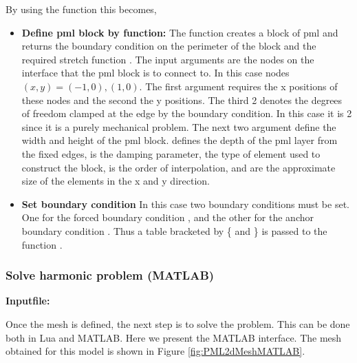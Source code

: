 \clearpage
By using the function  this becomes,
\begin{itemize}

  \item{\textbf{Define pml block by function:}}
  The function creates a block of pml and returns the boundary 
  condition on the perimeter of the block  and 
  the required stretch function . The input
  arguments are the nodes on the interface that the pml block is 
  to connect to. In this case nodes $(x,y) = (-1,0),(1,0)$. The
  first argument requires the x positions of these nodes and the 
  second the y positions. The third 2 denotes the degrees of freedom
  clamped at the edge by the boundary condition. In this case it is
  2 since it is a purely mechanical problem. The next two argument
  define the width and height of the pml block.  defines
  the depth of the pml layer from the fixed edges,  is the
  damping parameter,  the type of element used to construct
  the block,  is the order of interpolation, and 
   are the approximate size of the elements in the 
  x and y direction.

  \item{\textbf{Set boundary condition}}
  In this case two boundary conditions must be set. One for the 
  forced boundary condition , and the other for
  the anchor boundary condition . Thus a table
  bracketed by \{ and \} is passed to the function .

\end{itemize}

\clearpage
\subsubsection*{Solve harmonic problem (MATLAB)}
\begin{flushleft}
  \textbf{Inputfile:}
  \\
\end{flushleft}
\hspace{1in}
{\footnotesize
{}
}

\clearpage
Once the mesh is defined, the next step is to solve the problem.
This can be done both in Lua and MATLAB. Here we present the MATLAB
interface. 
The mesh obtained for this model is shown in 
Figure \ref{fig:PML2dMeshMATLAB}.

